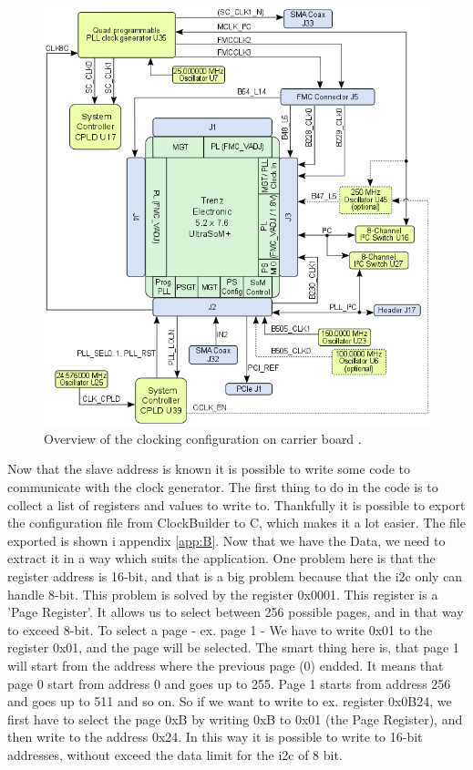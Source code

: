 \begin{figure}[H]
    \centering
    \includegraphics[width=.85\textwidth]{Graphics/BD-TEBF0808_Clocking.png}
    \caption{Overview of the clocking configuration on carrier board .}
    \label{fig:overview}
\end{figure}

Now that the slave address is known it is possible to write some code to communicate with the clock generator. The first thing to do in the code is to collect a list of registers and values to write to. Thankfully it is possible to export the configuration file from ClockBuilder to C, which makes it a lot easier. The file exported is shown i appendix \ref{app:B}. Now that we have the Data, we need to extract it in a way which suits the application. One problem here is that the register address is 16-bit, and that is a big problem because that the i2c only can handle 8-bit. This problem is solved by the register 0x0001. This register is a 'Page Register'. It allows us to select between 256 possible pages, and in that way to exceed 8-bit. To select a page - ex. page 1 - We have to write 0x01 to the register 0x01, and the page will be selected. The smart thing here is, that page 1 will start from the address where the previous page (0) endded. It means that page 0 start from address 0 and goes up to 255. Page 1 starts from address 256 and goes up to 511 and so on. So if we want to write to ex. register 0x0B24, we first have to select the page 0xB by writing 0xB to 0x01 (the Page Register), and then write to the address 0x24. In this way it is possible to write to 16-bit addresses, without exceed the data limit for the i2c of 8 bit.


